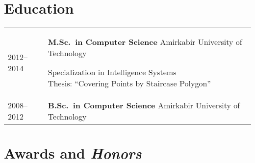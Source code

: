 \documentclass[a4paper,10pt]{article}
\newcommand{\graynote}[1]{\hfill{\footnotesize\color{lightgray}#1}}
\begin{document}
\section*{{\color{red}E}ducation}

\setlength{\extrarowheight}{9pt}
\begin{tabular}{ll}
2012--2014 & \parbox[t]{11cm}{
	\textbf{M.Sc.\ in Computer Science}
	\graynote{Amirkabir University of Technology}

	Specialization in Intelligence Systems \\[1pt]
	Thesis: ``Covering Points by Staircase Polygon''
} \\

2008--2012 & \parbox[t]{11cm}{
	\textbf{B.Sc.\ in Computer Science}
	\graynote{Amirkabir University of Technology}
} \\
\end{tabular}

\section*{{\color{orange}A}wards and \emph{Honors}}
\end{document}
